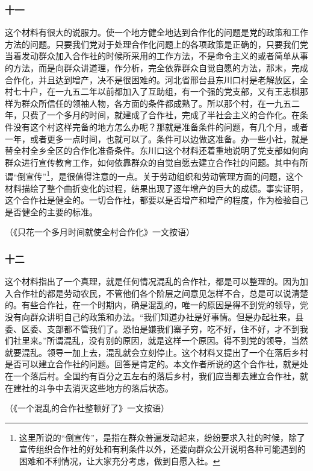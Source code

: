 \documentclass[cn,11pt,chinese]{elegantbook}
\def\myformat#1{\hfil\hfil #1}
\begin{document}
\subsubsection*{\myformat{十一}}
这个材料有很大的说服力。使一个地方健全地达到合作化的问题是党的政策和工作方法的问题。只要我们党对于处理合作化问题上的各项政策是正确的，只要我们党当着发动群众加入合作社的时候所采用的工作方法，不是命令主义的或者简单从事的方法，而是向群众讲道理，作分析，完全依靠群众自觉自愿的方法，那末，完成合作化，并且达到增产，决不是很困难的。河北省邢台县东川口村是老解放区，全村七十户，在一九五二年以前都加入了互助组，有一个强的党支部，又有王志棋那样为群众所信任的领袖人物，各方面的条件都成熟了。所以那个村，在一九五二年，只费了一个多月的时间，就建成了合作社，完成了半社会主义的合作化。在条件没有这个村这样完备的地方怎么办呢？那就是准备条件的问题，有几个月，或者一年，或者更多一点时间，也就可以了。条件可以边做这准备。办一些小社，就是替全村全乡全区的合作化准备条件。东川口这个材料还着重地说明了党支部如何向群众进行宣传教育工作，如何依靠群众的自觉自愿去建立合作社的问题。其中有所谓“倒宣传”\footnote[1]{这里所说的“倒宣传”，是指在群众普遍发动起来，纷纷要求入社的时候，除了宣传组织合作社的好处和有利条件以外，还要向群众公开说明各种可能遇到的困难和不利情况，让大家充分考虑，做到自愿入社。
}，是很值得注意的一点。关于劳动组织和劳动管理方面的问题，这个材料描绘了整个曲折变化的过程，结果出现了逐年增产的巨大的成绩。事实证明，这个合作社是健全的。一切合作社，都要以是否增产和增产的程度，作为检验自己是否健全的主要的标准。\\
\begin{flushright}（《只花一个多月时间就使全村合作化》一文按语）\end{flushright}
\subsubsection*{\myformat{十二}}
这个材料指出了一个真理，就是任何情况混乱的合作社，都是可以整理的。因为加入合作社的都是劳动农民，不管他们各个阶层之间意见怎样不合，总是可以说清楚的。有些合作社，在一个时期内，确是混乱的，唯一的原因是得不到党的领导，党没有向群众讲明自己的政策和办法。“我们知道办社是好事情。但是办起社来，县委、区委、支部都不管我们了。恐怕是嫌我们寨子穷，吃不好，住不好，才不到我们社里来。”所谓混乱，没有别的原因，就是这样一个原因。得不到党的领导，当然就要混乱。领导一加上去，混乱就会立刻停止。这个材料又提出了一个在落后乡村是否可以建立合作社的问题。回答是肯定的。本文作者所说的这个合作社，就是处在一个落后村。全国约有百分之五左右的落后乡村，我们应当都去建立合作社，就在建社的斗争中去消灭这些地方的落后状态。\\
\begin{flushright}（《一个混乱的合作社整顿好了》一文按语）\end{flushright}
\end{document}
